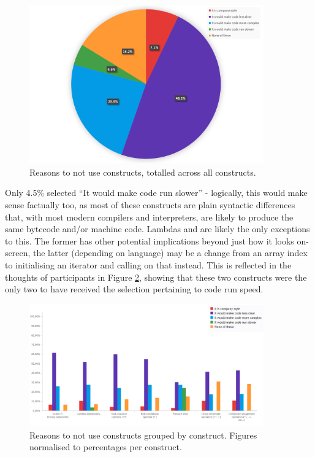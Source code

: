 \documentclass{article}
\begin{document}
            \begin{figure}[htbp]
                \centering
                \includegraphics[width=0.9\textwidth]{toNotUsePie}
                \caption{Reasons to not use constructs, totalled across all constructs.}
                \label{fig:toNotUsePie}
            \end{figure}

            Only 4.5\% selected ``It would make code run slower'' - logically, this would make sense factually too, as most of these constructs are plain syntactic differences that, with most modern compilers and interpreters, are likely to produce the same bytecode and/or machine code. Lambdas and  are likely the only exceptions to this. The former has other potential implications beyond just how it looks on-screen, the latter (depending on language) may be a change from an array index to initialising an iterator and calling on that instead. This is reflected in the thoughts of participants in Figure \ref{fig:toNotUse}, showing that these two constructs were the only two to have received the selection pertaining to code run speed.

            \begin{figure}[htbp]
                \centering
                \includegraphics[width=0.9\textwidth]{toNotUse}
                \caption{Reasons to not use constructs grouped by construct. Figures normalised to percentages per construct.}
                \label{fig:toNotUse}
            \end{figure}
\end{document}
